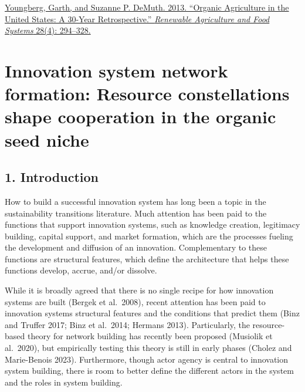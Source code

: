 \documentclass[twoside,12pt,final]{ucthesis-CA2012}
\begin{document}
\begin{ucmainmatter}
\href{https://www.zotero.org/google-docs/?hv36Bh}{Youngberg, Garth, and Suzanne P. DeMuth. 2013. ``Organic Agriculture in
the United States: A 30-Year Retrospective.'' \emph{Renewable Agriculture and
Food Systems} 28(4):
294--328.}

\hypertarget{innovation-system-network-formation-resource-constellations-shape-cooperation-in-the-organic-seed-niche}{%
\chapter{Innovation system network formation: Resource constellations shape cooperation in the organic seed niche}\label{innovation-system-network-formation-resource-constellations-shape-cooperation-in-the-organic-seed-niche}}


\hypertarget{introduction-3}{%
\section{1. Introduction}\label{introduction-3}}

How to build a successful innovation system has long been a topic in the
sustainability transitions literature. Much attention has been paid to
the functions that support innovation systems, such as knowledge
creation, legitimacy building, capital support, and market formation,
which are the processes fueling the development and diffusion of an
innovation. Complementary to these functions are structural features,
which define the architecture that helps these functions develop,
accrue, and/or dissolve.

While it is broadly agreed that there is no single recipe for how
innovation systems are built (Bergek et al.~2008), recent attention has
been paid to innovation systems\textquotesingle{} structural features and the conditions
that predict them (Binz and Truffer 2017; Binz et al.~2014; Hermans
2013). Particularly, the resource-based theory for network building has
recently been proposed (Musiolik et al.~2020), but empirically testing
this theory is still in early phases (Cholez and Marie-Benois 2023).
Furthermore, though actor agency is central to innovation system
building, there is room to better define the different actors in the
system and the roles in system building.


\end{ucmainmatter}
\end{document}
